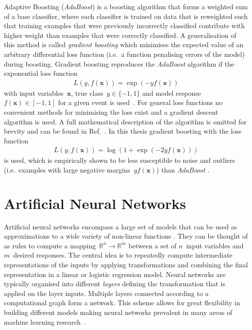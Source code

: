 Adaptive Boosting (\emph{AdaBoost}) is a boosting algorithm that forms a
weighted sum of a base classifier, where each classifier is trained on data that
is reweighted such that training examples  that were
previously incorrectly classified contribute with higher weight than examples
 that were correctly classified. A generalisation of
this method is called \emph{gradient boosting} which minimises the expected
value of an arbitrary differential loss function (i.e.\ a function penalising
errors of the model) during boosting. Gradient boosting reproduces the
\emph{AdaBoost} algorithm if the exponential loss function
\begin{align*}
  L\left(y, f(\mathbf{x})\right) = \exp\left(- y f(\mathbf{x})\right)
\end{align*}
with input variables~$\mathbf{x}$, true class~$y \in \{ -1, 1 \}$ and model
response~$f(\mathbf{x}) \in [-1, 1]$  for a
given event is used~\cite{esl}. For general loss functions no convenient methods
for minimising the loss exist and a gradient descent algorithm is used. A full
mathematical description of the algorithm is omitted for brevity and can be
found in Ref.~\cite{friedman_gbm, esl}. In this thesis gradient boosting with
the loss function
\begin{align*}
  L\left(y, f(\mathbf{x})\right) = \log\left( 1 + \exp(- 2 y f(\mathbf{x})) \right)
\end{align*}
is used, which is empirically shown to be less susceptible to noise
 and outliers (i.e.\
examples with large negative margins~$y f(\mathbf{x})$) than \emph{AdaBoost}
\cite{esl, schapire_boosting}.
%

\section{Artificial Neural Networks}
\label{sec:nn}

Artificial neural networks encompass a large set of models that can be used as
approximations to a wide variety of non-linear functions \cite{hornik}. They can
be thought of as rules to compute a
mapping~\mbox{$\mathbb{R}^n \rightarrow \mathbb{R}^m$} between a set of
$n$~input variables and $m$~desired responses. The central idea is to repeatedly
compute intermediate representations of the inputs by applying transformations
and combining the final representation in a linear or logistic regression model.
Neural networks are typically organised into different \emph{layers} defining
the transformation that is applied on the layer inputs. Multiple layers
connected according to a computational graph form a network. This scheme allows
for great flexibility in building different models making neural networks
prevalent in many areas of machine learning research~\cite{goodfellow_dl}.


